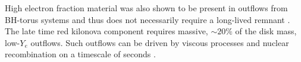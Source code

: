 High electron fraction material was also shown to be present in outflows 
from \ac{BH}-torus systems and thus does not necessarily require a long-lived remnant 
\citep{Fujibayashi:2020qda}.
The late time red kilonova component requires massive, ${\sim}20\%$ of the disk mass, 
low-$Y_e$ outflows. Such outflows can be driven by viscous processes and nuclear recombination 
on a timescale of seconds \citep[\eg][]{Metzger:2008av}.
%

